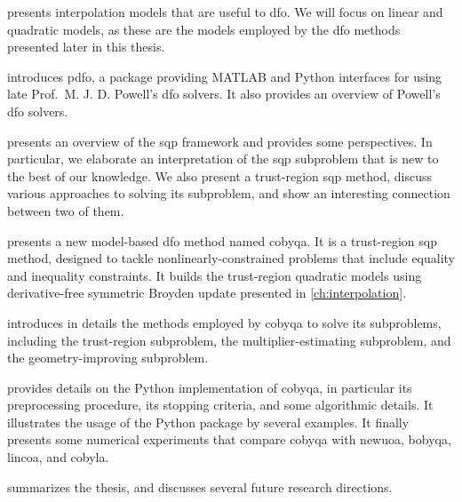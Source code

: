  presents interpolation models that are useful to \gls{dfo}.
We will focus on linear and quadratic models, as these are the models employed by the \gls{dfo} methods presented later in this thesis.

 introduces \gls{pdfo}, a package providing MATLAB and Python interfaces for using late Prof.\ M. J. D. Powell's \gls{dfo} solvers.
It also provides an overview of Powell's \gls{dfo} solvers.

 presents an overview of the \gls{sqp} framework and provides some perspectives.
In particular, we elaborate an interpretation of the \gls{sqp} subproblem that is new to the best of our knowledge.
We also present a trust-region \gls{sqp} method, discuss various approaches to solving its subproblem, and show an interesting connection between two of them.

 presents a new model-based \gls{dfo} method named \gls{cobyqa}.
It is a trust-region \gls{sqp} method, designed to tackle nonlinearly-constrained problems that include equality and inequality constraints.
It builds the trust-region quadratic models using derivative-free symmetric Broyden update presented in \cref{ch:interpolation}.

 introduces in details the methods employed by \gls{cobyqa} to solve its subproblems, including the trust-region subproblem, the multiplier-estimating subproblem, and the geometry-improving subproblem.

 provides details on the Python implementation of \gls{cobyqa}, in particular its preprocessing procedure, its stopping criteria, and some algorithmic details.
It illustrates the usage of the Python package by several examples.
It finally presents some numerical experiments that compare \gls{cobyqa} with \gls{newuoa}, \gls{bobyqa}, \gls{lincoa}, and \gls{cobyla}.

 summarizes the thesis, and discusses several future research directions.
